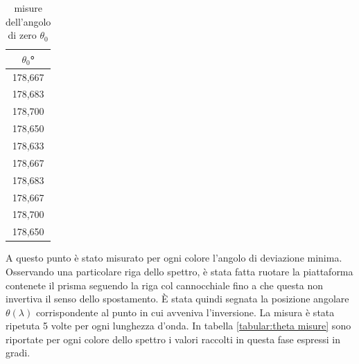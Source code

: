 \documentclass{article}
\begin{document}
        \begin{table}[H]

            \centering
            \begin{tabular}{c}

                \toprule 
                $\theta_0$° \\

                \midrule
                178,667\\
                178,683\\
                178,700\\
                178,650\\
                178,633\\
                178,667\\
                178,683\\
                178,667\\
                178,700\\
                178,650\\
                \bottomrule

            \end{tabular}

            \caption{misure dell'angolo di zero $\theta_0$}
            \label{tabular:theta zero}

        \end{table}

        A questo punto è stato misurato per ogni colore l'angolo di deviazione minima. 
        Osservando una particolare riga dello spettro, è stata fatta ruotare la piattaforma contenete il prisma seguendo la riga col cannocchiale 
        fino a che questa non invertiva il senso dello spostamento. È stata quindi segnata la posizione angolare $\theta(\lambda)$ corrispondente 
        al punto in cui avveniva l'inversione. La misura è stata ripetuta 5 volte per ogni lunghezza d'onda. 
        In tabella \ref{tabular:theta misure} sono riportate per ogni colore dello spettro i valori raccolti in questa fase espressi in gradi.
\end{document}
